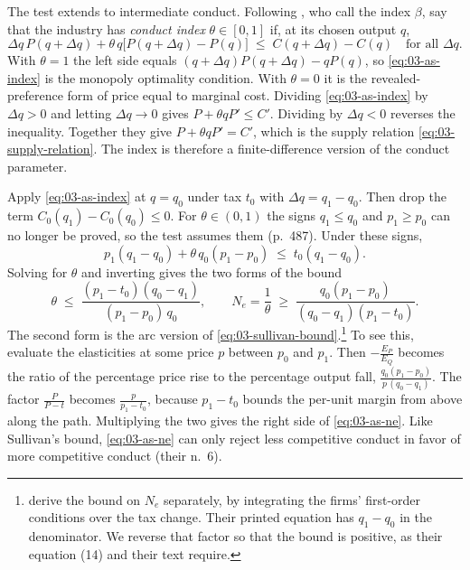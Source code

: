  The test extends to intermediate conduct. Following
\citet[eq.~12]{AshenfelterSullivan1987}, who call the index $\beta$, say that the industry has
\emph{conduct index} $\theta \in [0, 1]$ if, at its chosen output $q$,
\begin{equation}\label{eq:03-as-index}
  \Delta q\, P(q + \Delta q) + \theta\, q \bigl[P(q + \Delta q) - P(q)\bigr] \;\le\; C(q + \Delta q) - C(q)
  \quad \text{for all } \Delta q .
\end{equation}
With $\theta = 1$ the left side equals $(q + \Delta q)P(q + \Delta q) - qP(q)$, so \eqref{eq:03-as-index} is the
monopoly optimality condition. With $\theta = 0$ it is the revealed-preference form of price equal to marginal
cost. Dividing \eqref{eq:03-as-index} by $\Delta q > 0$ and letting $\Delta q \to 0$ gives $P + \theta q P'
\le C'$. Dividing by $\Delta q < 0$ reverses the inequality. Together they give $P + \theta q P' = C'$, which is
the supply relation \eqref{eq:03-supply-relation}. The index is therefore a finite-difference version of the
conduct parameter.

Apply \eqref{eq:03-as-index} at $q = q_0$ under tax $t_0$ with $\Delta q = q_1 - q_0$. Then drop the term
$C_0(q_1) - C_0(q_0) \le 0$. For $\theta \in (0, 1)$ the signs $q_1 \le q_0$ and $p_1 \ge p_0$ can no longer
be proved, so the test assumes them (p.~487). Under these signs,
\begin{equation*}
  p_1 (q_1 - q_0) + \theta\, q_0 (p_1 - p_0) \;\le\; t_0 (q_1 - q_0).
\end{equation*}
Solving for $\theta$ and inverting gives the two forms of the bound
\begin{equation}\label{eq:03-as-ne}
  \theta \;\le\; \frac{(p_1 - t_0)(q_0 - q_1)}{(p_1 - p_0)\, q_0},
  \qquad
  N_e = \frac{1}{\theta} \;\ge\; \frac{q_0 (p_1 - p_0)}{(q_0 - q_1)(p_1 - t_0)} .
\end{equation}
The second form is the arc version of \eqref{eq:03-sullivan-bound}.\footnote{\citet[eq.~18]{AshenfelterSullivan1987}
derive the bound on $N_e$ separately, by integrating the firms' first-order conditions over the tax change.
Their printed equation has $q_1 - q_0$ in the denominator. We reverse that factor so that the bound is
positive, as their equation (14) and their text require.} To see this, evaluate the elasticities at
some price $p$ between $p_0$ and $p_1$. Then $-\frac{E_P}{E_Q}$ becomes the ratio of the percentage price
rise to the percentage output fall, $\frac{q_0 (p_1 - p_0)}{p\,(q_0 - q_1)}$. The factor $\frac{P}{P - t}$
becomes $\frac{p}{p_1 - t_0}$, because $p_1 - t_0$ bounds the per-unit margin from above along the path.
Multiplying the two gives the right side of \eqref{eq:03-as-ne}. Like Sullivan's bound, \eqref{eq:03-as-ne} can only reject less
competitive conduct in favor of more competitive conduct (their n.~6).

